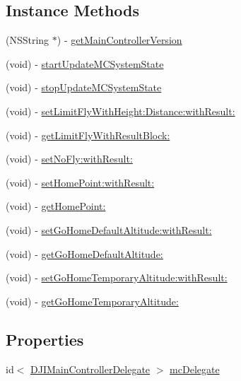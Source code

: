 \subsection*{Instance Methods}
\begin{DoxyCompactItemize}
\item 
(N\+S\+String $\ast$) -\/ \hyperlink{interface_d_j_i_main_controller_a405f7a49a8e7862464766a1e215a5c60}{get\+Main\+Controller\+Version}
\item 
(void) -\/ \hyperlink{interface_d_j_i_main_controller_a1879097a70fea7c2018ce2eb2083cafe}{start\+Update\+M\+C\+System\+State}
\item 
(void) -\/ \hyperlink{interface_d_j_i_main_controller_a23dd04927a580453afd2e688428ddabd}{stop\+Update\+M\+C\+System\+State}
\item 
(void) -\/ \hyperlink{interface_d_j_i_main_controller_a0eda335cc5b54d7427b2f34650da82a1}{set\+Limit\+Fly\+With\+Height\+:\+Distance\+:with\+Result\+:}
\item 
(void) -\/ \hyperlink{interface_d_j_i_main_controller_a41046d8038c97e2ae343d1df44eb5e3e}{get\+Limit\+Fly\+With\+Result\+Block\+:}
\item 
(void) -\/ \hyperlink{interface_d_j_i_main_controller_a98f618b316a5a302fe48d8592b95f5e4}{set\+No\+Fly\+:with\+Result\+:}
\item 
(void) -\/ \hyperlink{interface_d_j_i_main_controller_acb2e17e16ef2a7ed81a3a18e92ed2e88}{set\+Home\+Point\+:with\+Result\+:}
\item 
(void) -\/ \hyperlink{interface_d_j_i_main_controller_af4932ba75990e8c494e7f13b3a964c01}{get\+Home\+Point\+:}
\item 
(void) -\/ \hyperlink{interface_d_j_i_main_controller_adbea3d5c73fac755f88f82a16caf195f}{set\+Go\+Home\+Default\+Altitude\+:with\+Result\+:}
\item 
(void) -\/ \hyperlink{interface_d_j_i_main_controller_ae970b7f329da79a0aad189e339531d2b}{get\+Go\+Home\+Default\+Altitude\+:}
\item 
(void) -\/ \hyperlink{interface_d_j_i_main_controller_acf2c3e3ef4926bdbfcb1f7624f847b26}{set\+Go\+Home\+Temporary\+Altitude\+:with\+Result\+:}
\item 
(void) -\/ \hyperlink{interface_d_j_i_main_controller_a1f1d3ea5c7bd179f398484ff37207474}{get\+Go\+Home\+Temporary\+Altitude\+:}
\end{DoxyCompactItemize}
\subsection*{Properties}
\begin{DoxyCompactItemize}
\item 
id$<$ \hyperlink{protocol_d_j_i_main_controller_delegate-p}{D\+J\+I\+Main\+Controller\+Delegate} $>$ \hyperlink{interface_d_j_i_main_controller_a6ae013235289f0feaac2ca0ddda474b7}{mc\+Delegate}
\end{DoxyCompactItemize}


